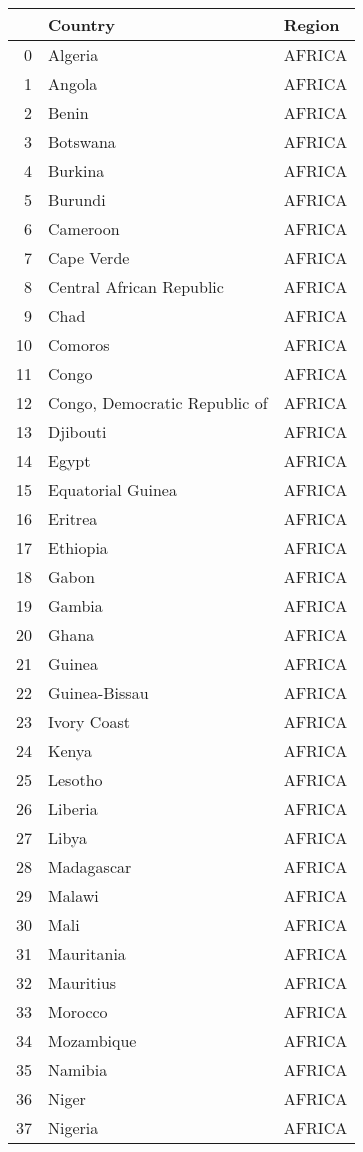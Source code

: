 \documentclass[11pt]{article}
\begin{document}
\begin{center}
\begin{tabular}{rll}
 & Country & Region\\
\hline
0 & Algeria & AFRICA\\
1 & Angola & AFRICA\\
2 & Benin & AFRICA\\
3 & Botswana & AFRICA\\
4 & Burkina & AFRICA\\
5 & Burundi & AFRICA\\
6 & Cameroon & AFRICA\\
7 & Cape Verde & AFRICA\\
8 & Central African Republic & AFRICA\\
9 & Chad & AFRICA\\
10 & Comoros & AFRICA\\
11 & Congo & AFRICA\\
12 & Congo, Democratic Republic of & AFRICA\\
13 & Djibouti & AFRICA\\
14 & Egypt & AFRICA\\
15 & Equatorial Guinea & AFRICA\\
16 & Eritrea & AFRICA\\
17 & Ethiopia & AFRICA\\
18 & Gabon & AFRICA\\
19 & Gambia & AFRICA\\
20 & Ghana & AFRICA\\
21 & Guinea & AFRICA\\
22 & Guinea-Bissau & AFRICA\\
23 & Ivory Coast & AFRICA\\
24 & Kenya & AFRICA\\
25 & Lesotho & AFRICA\\
26 & Liberia & AFRICA\\
27 & Libya & AFRICA\\
28 & Madagascar & AFRICA\\
29 & Malawi & AFRICA\\
30 & Mali & AFRICA\\
31 & Mauritania & AFRICA\\
32 & Mauritius & AFRICA\\
33 & Morocco & AFRICA\\
34 & Mozambique & AFRICA\\
35 & Namibia & AFRICA\\
36 & Niger & AFRICA\\
37 & Nigeria & AFRICA\\

\end{tabular}
\end{center}
\end{document}

